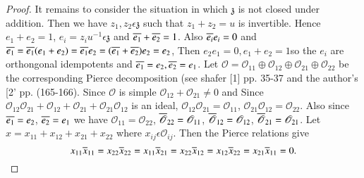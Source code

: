 \begin{proof}
It remains to consider the situation in which $\mathfrak{z}$ is not
closed under addition. Then we have $z_1,z_2\epsilon \mathfrak{z}$
such that $z_1+z_2=u$ is invertible. Hence $e_1+e_2=1$,
$e_i=z_iu^{-1}\epsilon \mathfrak{z}$ and $\overline{e_1}+\overline{e_2}=1$. Also
$\overline{e_i}e_i=0$ and
$\overline{e_1}=\overline{e_1}(e_1+e_2)=\overline{e_1}e_2=(\overline{e_1}+\overline{e_2})e_2=e_2$,
Then $e_2e_1=0,e_1+e_2=1$\pageoriginale so the $e_i$ are orthongonal
idempotents and $\overline{e_1}=e_2,\overline{e_2}=e_1$. Let
$\mathscr{O}=\mathscr{O}_{11}\oplus \mathscr{O}_{12}\oplus
\mathscr{O}_{21}\oplus \mathscr{O}_{22}$ be the corresponding Pierce
decomposition (see shafer [1] pp. 35-37 and the author's [2'
  pp. (165-166). Since $\mathscr{O}$ is simple
$\mathscr{O}_{12}+\mathscr{O}_{21}\neq 0$ and Since
$\mathscr{O}_{12}\mathscr{O}_{21}+\mathscr{O}_{12}+\mathscr{O}_{21}+\mathscr{O}_{21}\mathscr{O}_{12}$
is an ideal, $\mathscr{O}_{12}\mathscr{O}_{21}=\mathscr{O}_{11}$,
$\mathscr{O}_{21}\mathscr{O}_{12}=\mathscr{O}_{22}$. Also since
$\overline{e_1}=e_2$, $\overline{e_2}=e_1$ we have
$\mathscr{O}_{11}=\mathscr{O}_{22}$,
$\overline{\mathscr{O}}_{22}=\mathscr{O}_{11}$,
$\overline{\mathscr{O}}_{12}=\mathscr{O}_{12}$,
$\overline{\mathscr{O}}_{21}=\mathscr{O}_{21}$. Let
$x=x_{11}+x_{12}+x_{21}+x_{22}$ where $x_{ij}\epsilon
\mathscr{O}_{ij}$. Then the Pierce relations give
$$
x_{11}\overline{x}_{11}=x_{22}\overline{x}_{22}=x_{11}\overline{x}_{21}=x_{22}\overline{x}_{12}=x_{12}\overline{x}_{22}=x_{21}\overline{x}_{11}=0.
$$


\end{proof}
